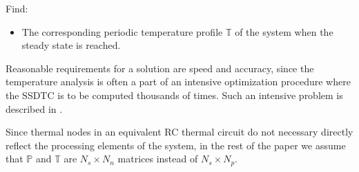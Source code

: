 Find:
\begin{itemize}
  \item The corresponding periodic temperature profile $\mathbb{T}$ of the system when the steady state is reached.
\end{itemize}

Reasonable requirements for a solution are speed and accuracy, since the temperature analysis is often a part of an intensive optimization procedure where the SSDTC is to be computed thousands of times. Such an intensive problem is described in .

Since thermal nodes in an equivalent RC thermal circuit do not necessary directly reflect the processing elements of the system, in the rest of the paper we assume that $\mathbb{P}$ and $\mathbb{T}$ are $N_s \times N_n$ matrices instead of $N_s \times N_p$.
